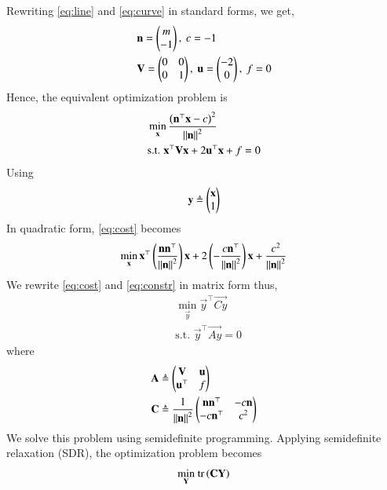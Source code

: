 \documentclass[journal,12pt,twocolumn]{IEEEtran}
\begin{document}
\begin{enumerate}
    \solution Rewriting \eqref{eq:line} and \eqref{eq:curve} in standard forms,
    we get,
    \begin{align}
        &\mathbf{n} = \begin{pmatrix}m\\-1\end{pmatrix},\ c = -1 \label{eq:line-params} \\
        &\mathbf{V} = \begin{pmatrix}0&0\\0&1\end{pmatrix},\ \mathbf{u} = \begin{pmatrix}-2\\0\end{pmatrix},\ f = 0 \label{eq:curve-params}
    \end{align}
    Hence, the equivalent optimization problem is
    \begin{align}
        &\min_{\mathbf{x}} \frac{\left(\mathbf{n}^\top\mathbf{x}-c\right)^2}{\left\lVert\mathbf{n}\right\rVert^2} \label{eq:cost} \\
        &\textrm{s.t. } \mathbf{x}^\top\mathbf{Vx} + 2\mathbf{u}^\top\mathbf{x} + f = 0 \label{eq:constr}
    \end{align}
    Using
    \begin{align}
        \mathbf{y} \triangleq \begin{pmatrix}\mathbf{x}\\1\end{pmatrix} 
        \label{eq:y-def}
    \end{align}
    In quadratic form, \eqref{eq:cost} becomes
    \begin{align}
        \min_{\mathbf{x}} \mathbf{x}^\top\left(\frac{\mathbf{nn}^\top}{\left\lVert\mathbf{n}\right\rVert^2}\right)\mathbf{x} + 2\left(-\frac{c\mathbf{n}^\top}{\left\lVert\mathbf{n}\right\rVert^2}\right)\mathbf{x} + \frac{c^2}{\left\lVert\mathbf{n}\right\rVert^2}
    \end{align}
    We rewrite \eqref{eq:cost} and \eqref{eq:constr} in matrix form thus,
    \begin{align}
        &\min_{\vec{y}} \vec{y}^\top\vec{Cy} \label{eq:y-cost} \\
        &\textrm{s.t. } \vec{y}^\top\vec{Ay} = 0 \label{eq:y-constr}
    \end{align}
    where
    \begin{align}
        \mathbf{A} &\triangleq \begin{pmatrix}\mathbf{V}&\mathbf{u}\\\mathbf{u}^\top&f\end{pmatrix} \label{eq:A-def} \\
        \mathbf{C} &\triangleq \frac{1}{\left\lVert\mathbf{n}\right\rVert^2}\begin{pmatrix}\mathbf{nn}^\top & -c\mathbf{n} \\ -c\mathbf{n}^\top & c^2\end{pmatrix} \label{eq:C-def}
    \end{align}
    We solve this problem using semidefinite programming. Applying
    semidefinite relaxation (SDR), the optimization problem becomes
    \begin{align}
        \min_{\vec{Y}}\ &\tr{\vec{CY}} \label{eq:sd-cost} \\

\end{align}
\end{enumerate}
\end{document}
